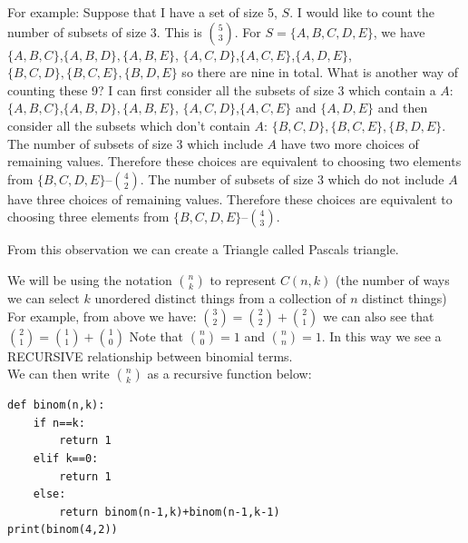 \begin{exmp}
For example:
Suppose that I have a set of size 5, $S$. I would like to count the number of subsets of size 3. This is $\binom{5}{3}$.
\newline
For $S=\{A,B,C,D,E\}$, we have 
$\{A,B,C\}$,$\{A,B,D\}, \{A,B,E\}$,
$\{A,C,D\}$,$\{A,C,E\}$,$\{A,D,E\}$,
$\{B,C,D\},\{B,C,E\},\{B,D,E\}$
\newline
so there are nine in total. 
\newline
What is another way of counting these 9?
\newline
I can first consider all the subsets of size 3 which contain a $A$: $\{A,B,C\}$,$\{A,B,D\}, \{A,B,E\}$,
$\{A,C,D\}$,$\{A,C,E\}$ and $\{A,D,E\}$
and then consider all the subsets which don't contain $A$: $\{B,C,D\},\{B,C,E\},\{B,D,E\}$.
\newline
The number of subsets of size 3 which include $A$ have two more choices of remaining values. Therefore these choices are equivalent to choosing two elements from $\{B,C,D,E\}$--$\binom{4}{2}$.
\newline
The number of subsets of size 3 which do not include $A$ have three choices of remaining values. Therefore these choices are equivalent to choosing three elements from $\{B,C,D,E\}$--$\binom{4}{3}$.
\end{exmp}
 From this observation we can create a Triangle called Pascals triangle. 


\begin{exmp}
We will be using the notation $\binom{n}{k}$ to represent $C(n,k)$ (the number of ways we can select $k$ unordered distinct things from a collection of $n$ distinct things)
For example, from above we have:
\newline
$\binom{3}{2}=\binom{2}{2}+\binom{2}{1}$
\newline
we can also see that $\binom{2}{1}=\binom{1}{1}+\binom{1}{0}$
\newline
Note that $\binom{n}{0}=1$ and $\binom{n}{n}=1$.
\newline
In this way we see a RECURSIVE relationship between binomial terms.\\
We can then write $\binom{n}{k}$ as a recursive function below:
\newline
\begin{verbatim}
def binom(n,k):
    if n==k:
        return 1
    elif k==0:
        return 1
    else:
        return binom(n-1,k)+binom(n-1,k-1)
print(binom(4,2))
\end{verbatim}
\end{exmp}

